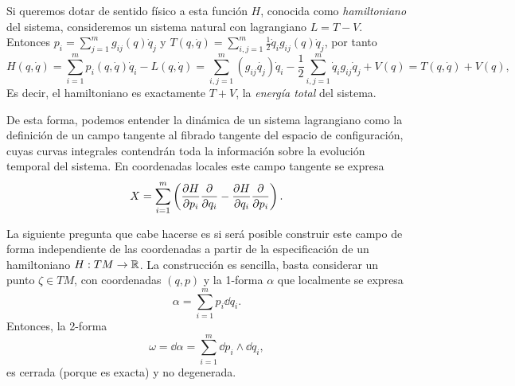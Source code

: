   Si queremos dotar de sentido físico a esta función $H$, conocida como \emph{hamiltoniano} del sistema, consideremos un sistema natural con lagrangiano $L=T-V$. Entonces $p_i=\sum_{j=1}^m g_{ij}(q)\dot{q}_j$ y $T(q,\dot{q})=\sum_{i,j=1}^m\frac{1}{2}\dot{q}_ig_{ij}(q)\dot{q}_j$, por tanto
\begin{equation*}
  H(q,\dot{q})=\sum_{i=1}^m p_i(q,\dot{q})\dot{q}_i - L(q,\dot{q})=\sum_{i,j=1}^m (g_{ij} \dot{q_j})\dot{q}_i - \frac{1}{2}\sum_{i,j=1}^m \dot{q}_i g_{ij} \dot{q}_j + V(q)=T(q,\dot{q})+V(q),
\end{equation*}
Es decir, el hamiltoniano es exactamente $T+V$, la \emph{energía total} del sistema.
  
 De esta forma, podemos entender la dinámica de un sistema lagrangiano como la definición de un campo tangente al fibrado tangente del espacio de configuración, cuyas curvas integrales contendrán toda la información sobre la evolución temporal del sistema. En coordenadas locales este campo tangente se expresa
 \begin{equation*}
   X=\sum_{i=1}^m \left( \frac{\partial H}{\partial p_i}\frac{\partial}{\partial q_i}-\frac{\partial H}{\partial q_i}\frac{\partial}{\partial p_i} \right).
 \end{equation*}
  
 La siguiente pregunta que cabe hacerse es si será posible construir este campo de forma independiente de las coordenadas a partir de la especificación de un hamiltoniano $H:TM \rightarrow \mathbb{R}$. La construcción es sencilla, basta considerar un punto $\zeta \in TM$, con coordenadas $(q,p)$ y la 1-forma $\alpha$ que localmente se expresa
 \begin{equation*}
   \alpha = \sum_{i=1}^m p_i \dd q_i.
 \end{equation*}
 Entonces, la 2-forma
 \begin{equation*}
   \omega=\dd \alpha = \sum_{i=1}^m \dd p_i \wedge \dd q_i,
 \end{equation*}
 es cerrada (porque es exacta) y no degenerada. 

